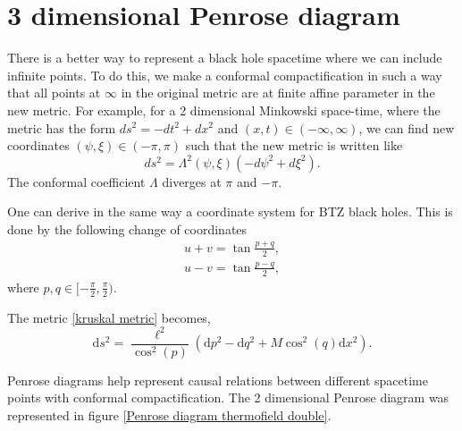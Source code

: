\section{3 dimensional Penrose diagram}

There is a better way to represent a black hole spacetime where we can include infinite points. To do this, we make a conformal compactification in such a way that all points at $\infty$ in the original metric are at finite affine parameter in the new metric. For example, for a  2 dimensional Minkowski space-time, where the metric has the form $ds^2= -dt^2 + dx^2$ and $(x,t)\in(-\infty,\infty)$, we can find new coordinates $\left(\psi,\xi\right)\in\left(-\pi,\pi\right)$ such that the new metric is written like 
\begin{equation}
    ds^2 = \Lambda^2\left(\psi,\xi\right)\left(-d\psi^2+d\xi^2\right).
\end{equation}
The conformal coefficient $\Lambda$ diverges at $\pi$ and $-\pi$.

One can derive in the same way a coordinate system for BTZ black holes. This is done by the following change of coordinates
\begin{subequations}
\label{Penrose coord}
\begin{align}
     u + v = \tan\frac{p+q}{2},\label{Perose +}\\
     u - v = \tan\frac{p-q}{2},\label{Penrose -}
\end{align}
\end{subequations}
where $p,q\in[-\frac{\pi}{2},\frac{\pi}{2})$.

The metric \ref{kruskal metric} becomes,
\begin{equation}
    \text{d}s^2=\frac{\ell^2}{\cos^2(p)}\left(\text{d}p^2-\text{d}q^2+M\cos^2(q)\text{d}x^2\right).
\end{equation}


Penrose diagrams help represent causal relations between different spacetime points with conformal compactification. The 2 dimensional Penrose diagram was represented in figure \ref{Penrose diagram thermofield double}.

